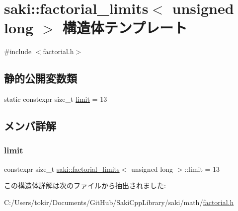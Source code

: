 \hypertarget{structsaki_1_1factorial__limits_3_01unsigned_01long_01_4}{}\section{saki\+:\+:factorial\+\_\+limits$<$ unsigned long $>$ 構造体テンプレート}
\label{structsaki_1_1factorial__limits_3_01unsigned_01long_01_4}


{\ttfamily \#include $<$factorial.\+h$>$}

\subsection*{静的公開変数類}
\begin{DoxyCompactItemize}
\item 
static constexpr size\+\_\+t \mbox{\hyperlink{structsaki_1_1factorial__limits_3_01unsigned_01long_01_4_aebc732144c6ce41767d87c7cda6d9abe}{limit}} = 13
\end{DoxyCompactItemize}


\subsection{メンバ詳解}
\mbox{\label{structsaki_1_1factorial__limits_3_01unsigned_01long_01_4_aebc732144c6ce41767d87c7cda6d9abe}} 
\subsubsection{\texorpdfstring{limit}{limit}}
{\footnotesize\ttfamily constexpr size\+\_\+t \mbox{\hyperlink{structsaki_1_1factorial__limits}{saki\+::factorial\+\_\+limits}}$<$ unsigned long $>$\+::limit = 13\hspace{0.3cm}{\ttfamily [static]}}



この構造体詳解は次のファイルから抽出されました\+:\begin{DoxyCompactItemize}
\item 
C\+:/\+Users/tokir/\+Documents/\+Git\+Hub/\+Saki\+Cpp\+Library/saki/math/\mbox{\hyperlink{factorial_8h}{factorial.\+h}}\end{DoxyCompactItemize}
